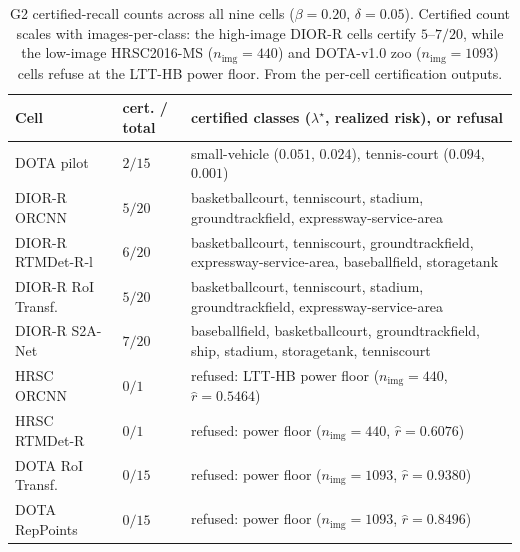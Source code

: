 \documentclass[11pt]{article}
\begin{document}
\begin{table}[t]\centering\small
\caption{G2 certified-recall counts across all nine cells ($\beta{=}0.20$, $\delta{=}0.05$). Certified count
scales with images-per-class: the high-image DIOR-R cells certify $5$--$7/20$, while the low-image
HRSC2016-MS ($n_{\mathrm{img}}{=}440$) and DOTA-v1.0 zoo ($n_{\mathrm{img}}{=}1093$) cells refuse at the
LTT-HB power floor. From the per-cell certification outputs.}\label{tab:g2}
\begin{tabular}{ll>{\raggedright\arraybackslash}p{}}
\toprule
Cell & cert. / total & certified classes ($\lambda^\star$, realized risk), or refusal \\
\midrule
DOTA pilot           & $2/15$ & small-vehicle ($0.051$, $0.024$), tennis-court ($0.094$, $0.001$) \\
DIOR-R ORCNN         & $5/20$ & basketballcourt, tenniscourt, stadium, groundtrackfield, expressway-service-area \\
DIOR-R RTMDet-R-l    & $6/20$ & basketballcourt, tenniscourt, groundtrackfield, expressway-service-area, baseballfield, storagetank \\
DIOR-R RoI Transf.   & $5/20$ & basketballcourt, tenniscourt, stadium, groundtrackfield, expressway-service-area \\
DIOR-R S2A-Net       & $7/20$ & baseballfield, basketballcourt, groundtrackfield, ship, stadium, storagetank, tenniscourt \\
HRSC ORCNN           & $0/1$  & refused: LTT-HB power floor ($n_{\mathrm{img}}{=}440$, $\hat r{=}0.5464$) \\
HRSC RTMDet-R        & $0/1$  & refused: power floor ($n_{\mathrm{img}}{=}440$, $\hat r{=}0.6076$) \\
DOTA RoI Transf.     & $0/15$ & refused: power floor ($n_{\mathrm{img}}{=}1093$, $\hat r{=}0.9380$) \\
DOTA RepPoints       & $0/15$ & refused: power floor ($n_{\mathrm{img}}{=}1093$, $\hat r{=}0.8496$) \\
\bottomrule
\end{tabular}
\end{table}
\end{document}
